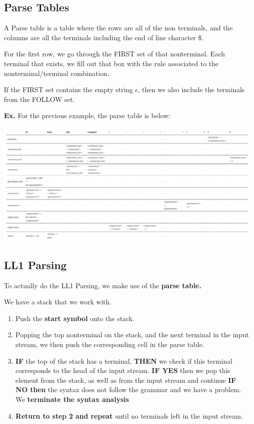 \documentclass[12pt,letterpaper]{article} \usepackage{amsmath} \usepackage{graphicx} \usepackage[margin=1in]{geometry} \usepackage{longtable}  \usepackage{amssymb}
\begin{document}
	\subsection{Parse Tables}
	A Parse table is a table where the rows are all of the non terminals, and the columns are all the terminals including the end of line character $\$$.
	
	For the first row, we go through the FIRST set of that nonterminal. Each terminal that exists, we fill out that box with the rule associated to the nonterminal/terminal combination. 
	
	If the FIRST set contains the empty string $\epsilon$, then we also include the terminals from the FOLLOW set. 
	
	\begin{mdframed}
		\textbf{Ex.} For the previous example, the parse table is below:
		\begin{center}
			\includegraphics[width=1\linewidth]{ex-parsetable}
		\end{center}
		
	\end{mdframed}
	
	\subsection{LL1 Parsing}
	To actually do the LL1 Parsing, we make use of the \textbf{parse table. }
	
	We have a stack that we work with.
	\begin{enumerate}
		\item Push the \textbf{start symbol} onto the stack.
		\item Popping the top nonterminal on the stack, and the next terminal in the input stream, we then push the corresponding cell in the parse table.
		\item \textbf{IF} the top of the stack has a terminal, \textbf{THEN} we check if this terminal corresponds to the head of the input stream. 
		\subitem \textbf{IF YES} then we pop this element from the stack, as well as from the input stream and continue
		\subitem \textbf{IF NO then} the syntax does not follow the grammar and we have a problem. We \textbf{terminate the syntax analysis}
		\item \textbf{Return to step 2 and repeat} until no terminals left in the input stream.
	\end{enumerate}
	
\end{document}
